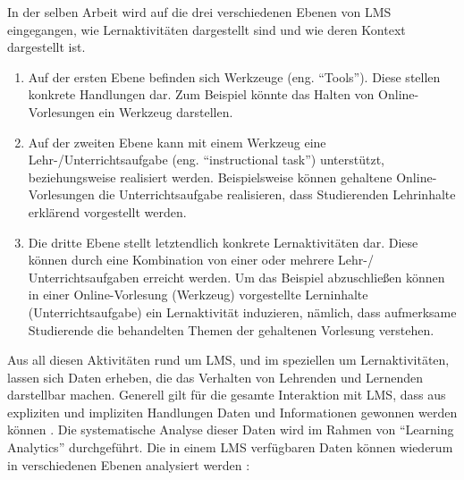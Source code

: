 In der selben Arbeit \autocite[S.247]{SCHOONENBOOM2014247} wird auf die drei verschiedenen Ebenen von \ac{LMS} eingegangen, wie Lernaktivitäten dargestellt sind und wie deren Kontext dargestellt ist.
\begin{enumerate}
	\item Auf der ersten Ebene befinden sich Werkzeuge (eng. \enquote{Tools}). Diese stellen konkrete Handlungen dar. Zum Beispiel könnte das Halten von Online-Vorlesungen ein Werkzeug darstellen.
	\item Auf der zweiten Ebene kann mit einem Werkzeug eine Lehr-/Unterrichtsaufgabe (eng. \enquote{instructional task}) unterstützt, beziehungsweise realisiert werden. Beispielsweise können gehaltene Online-Vorlesungen die Unterrichtsaufgabe realisieren, dass Studierenden Lehrinhalte erklärend vorgestellt werden.
	\item Die dritte Ebene stellt letztendlich konkrete Lernaktivitäten dar. Diese können durch eine Kombination von einer oder mehrere Lehr-/ Unterrichtsaufgaben erreicht werden. Um das Beispiel abzuschließen können in einer Online-Vorlesung (Werkzeug) vorgestellte Lerninhalte (Unterrichtsaufgabe) ein Lernaktivität induzieren, nämlich, dass aufmerksame Studierende die behandelten Themen der gehaltenen Vorlesung verstehen.	
\end{enumerate}

Aus all diesen Aktivitäten rund um \ac{LMS}, und im speziellen um Lernaktivitäten, lassen sich Daten erheben, die das Verhalten von Lehrenden und Lernenden darstellbar machen. Generell gilt für die gesamte Interaktion mit \ac{LMS}, dass aus expliziten und impliziten Handlungen Daten und Informationen gewonnen werden können \autocite[S.26]{2012HorizonReport}. Die systematische Analyse dieser Daten wird im Rahmen von \enquote{Learning Analytics} durchgeführt. Die in einem \ac{LMS} verfügbaren Daten können wiederum in verschiedenen Ebenen analysiert werden \autocite[S.2f]{learningAnalyticsImHochschulkontext} \autocite{penetratingTheFogAnalyticsInLearningAndEducation}:

